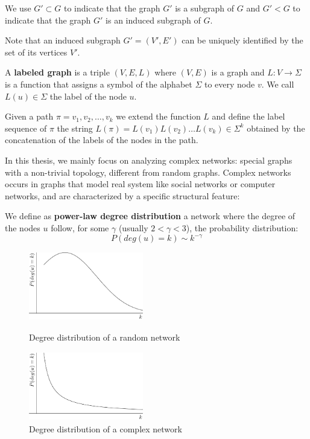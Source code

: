 We use $G' \subset G$ to indicate that the graph $G'$ is a subgraph of $G$ and $G' < G$ to indicate that the graph $G'$ is an induced subgraph of $G$.\medskip

Note that an induced subgraph $G' = (V', E')$ can be uniquely identified by the set of its vertices $V'$.

\begin{definizione}\label{def:labeledgraph}
	A \textbf{labeled graph} is a triple $(V,E,L)$ where $(V,E)$ is a graph and $L : V \rightarrow \Sigma$
	is a function that assigns a symbol of the alphabet $\Sigma$ to every node $v$. We call $L(u) \in \Sigma$ the label of the node $u$.
\end{definizione}

Given a path $\pi = v_{1}, v_{2}, \ldots, v_{k}$ we extend the function $L$ and define the label sequence of $\pi$ the string $L(\pi) = L(v_{1}) L(v_{2}) \ldots L(v_{k}) \in \Sigma^{k}$ obtained by the concatenation of the labels of the nodes in the path.\medskip

In this thesis, we mainly focus on analyzing complex networks: special graphs with a non-trivial topology, different from random graphs. Complex networks occurs in graphs that model real system like social networks or computer networks, and are characterized by a specific structural feature:

\begin{definizione}\label{def:power-law-graph}
	We define as \textbf{power-law degree distribution} a network where the degree of the nodes $u$ follow, for some $\gamma$ (usually $2 < \gamma < 3$), the probability distribution:
	\begin{equation}
	P(deg(u) = k) \sim k^{-\gamma}  
	\end{equation}
\end{definizione}

\begin{figure}[h]
	\centering
	\begin{minipage}[t]{.45\textwidth}
		\centering
		\includegraphics[width=5cm,height=3cm]{figure/figure-1-1}
		\caption{Degree distribution of a random network}
	\end{minipage}\hfill
	\begin{minipage}[t]{.45\textwidth}
		\centering 
		\includegraphics[width=5cm,height=3cm]{figure/figure-1-2}
		\caption{Degree distribution of a complex network}
	\end{minipage}
\end{figure}

